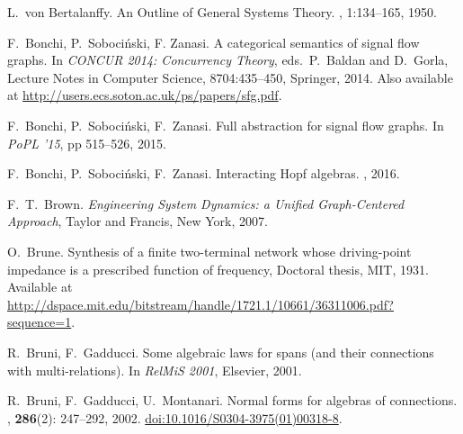 \begin{thebibliography}{RSW00}
    L.\ von Bertalanffy. 
    \newblock An Outline of General Systems Theory.
    , 1:134--165,
    1950.

    F.\ Bonchi, P.\ Soboci\'nski, F. Zanasi.
    \newblock A categorical semantics of signal flow graphs.
    \newblock In \emph{CONCUR 2014: Concurrency Theory}, eds.\ P.\ Baldan and
    D.\ Gorla, Lecture Notes in Computer Science, 8704:435--450, Springer, 2014.
    \newblock Also available at
    \href{http://users.ecs.soton.ac.uk/ps/papers/sfg.pdf}
    {http://users.ecs.soton.ac.uk/ps/papers/sfg.pdf}.
    
    F.\ Bonchi, P.\ Soboci\'nski, F.\ Zanasi.
    \newblock Full abstraction for signal flow graphs.
    \newblock In \emph{PoPL '15}, pp 515--526, 2015.

    F.\ Bonchi, P.\ Soboci\'nski, F.\ Zanasi.
    \newblock Interacting Hopf algebras.
    , 2016.



    F.\ T.\ Brown.
    \newblock \textsl{Engineering System Dynamics: a 
    Unified Graph-Centered Approach}, Taylor and Francis, New York, 2007. 

    O.\ Brune.
    \newblock Synthesis of a finite two-terminal network whose
    driving-point impedance is a prescribed function of frequency, Doctoral
    thesis, MIT, 1931.
    \newblock Available at
    \href{http://dspace.mit.edu/bitstream/handle/1721.1/10661/36311006.pdf?sequence=1}
    {http://dspace.mit.edu/bitstream/handle/1721.1/10661/36311006.pdf?sequence=1}.

    R.\ Bruni, F.\ Gadducci.
    \newblock Some algebraic laws for spans (and their
    connections with multi-relations).
    \newblock In \textsl{RelMiS 2001}, Elsevier, 2001.

    R.\ Bruni, F.\ Gadducci, U.\ Montanari.
    \newblock Normal forms for algebras of connections.
    , {\bf 286}(2): 247--292, 2002. 
    \newblock \href{http://dx.doi.org/10.1016/S0304-3975(01)00318-8}{doi:10.1016/S0304-3975(01)00318-8}.


\end{thebibliography}
